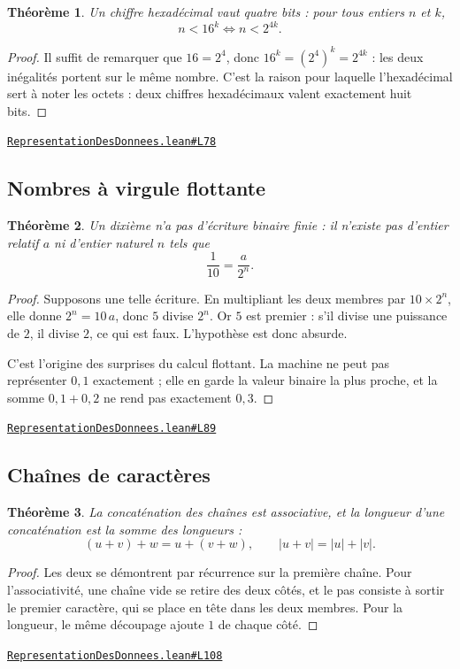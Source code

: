 \documentclass[11pt,a4paper]{article}
\theoremstyle{definition}
\theoremstyle{plain}
\newtheorem{theoreme}{Théorème}
\newcommand{\source}[2]{\par\smallskip\noindent\hfill{\footnotesize\href{#1}{\texttt{#2}}}\par\smallskip}
\begin{document}
\begin{theoreme}
Un chiffre hexadécimal vaut quatre bits : pour tous entiers $n$ et $k$,
\[ n < 16^k \iff n < 2^{4k} . \]
\end{theoreme}
\begin{proof}
Il suffit de remarquer que $16 = 2^4$, donc $16^k = (2^4)^k = 2^{4k}$ : les deux
inégalités portent sur le même nombre. C'est la raison pour laquelle l'hexadécimal sert à
noter les octets : deux chiffres hexadécimaux valent exactement huit bits.
\end{proof}
\source{https://github.com/Commutator-IO/learn-lean/blob/main/courses/02-lycee/11-informatique-nsi/RepresentationDesDonnees.lean\#L78}{RepresentationDesDonnees.lean\#L78}

\subsection{Nombres à virgule flottante}

\begin{theoreme}
Un dixième n'a pas d'écriture binaire finie : il n'existe pas d'entier relatif $a$ ni
d'entier naturel $n$ tels que
\[ \frac{1}{10} = \frac{a}{2^n} . \]
\end{theoreme}
\begin{proof}
Supposons une telle écriture. En multipliant les deux membres par $10 \times 2^n$, elle
donne $2^n = 10\,a$, donc $5$ divise $2^n$. Or $5$ est premier : s'il divise une puissance
de $2$, il divise $2$, ce qui est faux. L'hypothèse est donc absurde.

C'est l'origine des surprises du calcul flottant. La machine ne peut pas représenter
$0{,}1$ exactement ; elle en garde la valeur binaire la plus proche, et la somme
$0{,}1 + 0{,}2$ ne rend pas exactement $0{,}3$.
\end{proof}
\source{https://github.com/Commutator-IO/learn-lean/blob/main/courses/02-lycee/11-informatique-nsi/RepresentationDesDonnees.lean\#L89}{RepresentationDesDonnees.lean\#L89}

\subsection{Chaînes de caractères}

\begin{theoreme}
La concaténation des chaînes est associative, et la longueur d'une concaténation est la
somme des longueurs :
\[ (u + v) + w = u + (v + w), \qquad |u + v| = |u| + |v| . \]
\end{theoreme}
\begin{proof}
Les deux se démontrent par récurrence sur la première chaîne. Pour l'associativité, une
chaîne vide se retire des deux côtés, et le pas consiste à sortir le premier caractère,
qui se place en tête dans les deux membres. Pour la longueur, le même découpage ajoute
$1$ de chaque côté.
\end{proof}
\source{https://github.com/Commutator-IO/learn-lean/blob/main/courses/02-lycee/11-informatique-nsi/RepresentationDesDonnees.lean\#L108}{RepresentationDesDonnees.lean\#L108}
\end{document}
